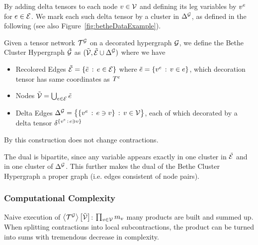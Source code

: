 By adding delta tensors to each node $v\in\mathcal{V}$ and defining its leg variables by $v^{e}$ for $e\in\mathcal{E}$.
We mark each such delta tensor by a cluster in $\Delta^{\mathcal{G}}$, as defined in the following (see also Figure~\ref{fig:betheDataExample}).

\begin{definition}
	Given a tensor network $\mathcal{T}^{\mathcal{G}}$ on a decorated hypergraph $\mathcal{G}$, we define the Bethe Cluster Hypergraph $\tilde{\mathcal{G}}$ as
	$(\tilde{\mathcal{V}}, \tilde{\mathcal{E}} \cup \Delta^{\mathcal{G}})$ where we have
	\begin{itemize}
		\item Recolored Edges $\tilde{\mathcal{E}} = \{\tilde{e} \, : \, e\in \mathcal{E}\}$ where $\tilde{e} = \{v^{e} \, : \, v\in e\}$, which decoration tensor has same coordinates as $T^{e}$
		\item Nodes $\tilde{\mathcal{V}} = \bigcup_{e\in\mathcal{E}}\tilde{e}$ %
		\item Delta Edges $\Delta^{\mathcal{G}} =  \big\{ \{v^{e} \, : \, e\ni v \} \, : \, v\in\mathcal{V} \big\} $, each of which decorated by a delta tensor $\delta^{\{v^{e} \, : \, e\ni v \}}$
	\end{itemize}
\end{definition}

By  this construction does not change contractions.

The dual is bipartite, since any variable appears exactly in one cluster in $\tilde{\mathcal{E}}$ and in one cluster of $\Delta^{\mathcal{G}}$.
This further makes the dual of the Bethe Cluster Hypergraph a proper graph (i.e. edges consistent of node pairs). 





\subsubsection{Computational Complexity}


Naive execution of $\left\langle \mathcal{T}^{\mathcal{G}}\right\rangle \left[ \tilde{\mathcal{V}} \right]$: $\prod_{v\in\mathcal{V}} m_{v}$ many products are built and summed up.
When splitting contractions into local subcontractions, the product can be turned into sums with tremendous decrease in complexity.









